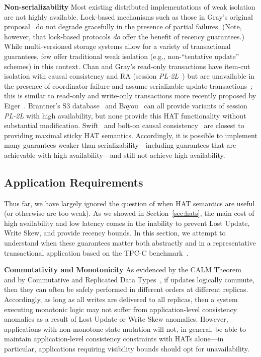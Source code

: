 \vspace{.5em}\noindent\textbf{Non-serializability} Most existing
distributed implementations of weak isolation are not highly
available. Lock-based mechanisms such as those in Gray's original
proposal~\cite{gray-isolation} do not degrade gracefully in the
presence of partial failures. (Note, however, that lock-based
protocols \textit{do} offer the benefit of recency guarantees.) While
multi-versioned storage systems allow for a variety of transactional
guarantees, few offer traditional weak isolation (e.g.,
non-``tentative update'' schemes) in this context.  Chan and Gray's
read-only transactions have item-cut isolation with causal consistency
and RA (session \textit{PL-2L}~\cite{adya}) but are unavailable in the
presence of coordinator failure and assume serializable update
transactions~\cite{readonly}; this is similar to read-only and
write-only transactions more recently proposed by
Eiger~\cite{eiger}.  Brantner's S3 database~\cite{kraska-s3}
and Bayou~\cite{sessionguarantees} can all provide variants of session
\textit{PL-2L} with high availability, but none provide this HAT
functionality without substantial modification. Swift~\cite{swift} and
bolt-on causal consistency~\cite{bolton} are closest to providing
maximal sticky HAT semantics. Accordingly, it is possible to implement
many guarantees weaker than serializability---including guarantees
that are achievable with high availability---and still not achieve
high availability.

\subsection{Application Requirements}

Thus far, we have largely ignored the question of when HAT semantics
are useful (or otherwise are too weak). As we showed in
Section~\ref{sec:hats}, the main cost of high availability and low
latency comes in the inability to prevent Lost Update, Write Skew, and
provide recency bounds. In this section, we attempt to understand when
these guarantees matter both abstractly and in a representative
transactional application based on the TPC-C benchmark~\cite{tpcc}.

\vspace{.5em}\noindent\textbf{Commutativity and Monotonicity} As
evidenced by the CALM Theorem~\cite{calm} and by Commutative and
Replicated Data Types~\cite{crdt}, if updates logically commute, then
they can often be safely performed in different orders at different
replicas. Accordingly, as long as all writes are delivered to all
replicas, then a system executing monotonic logic may not suffer from
application-level consistency anomalies as a result of Lost Update or
Write Skew anomalies. However, applications with non-monotone state
mutation will not, in general, be able to maintain application-level
consistency constraints with HATs alone---in particular, applications
requiring visibility bounds should opt for unavailability.

